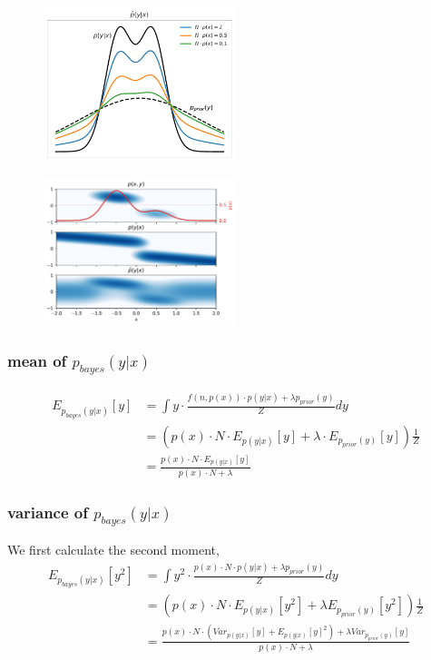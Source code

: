 \begin{figure}[H]
    \centering
    \includegraphics[width=0.5\textwidth]{Pictures/mixture_predictive_bayesian.pdf}
\end{figure}

\begin{figure}[H]
    \centering
    \includegraphics[width=0.5\textwidth]{Pictures/mixture_predictive_bayesian2D.pdf}
\end{figure}

\subsubsection*{mean of $p_{bayes}(y|x)$}
\begin{align*}
    E_{p_{bayes}(y|x)}[y] &= \int y \cdot \frac{f(n,p(x)) \cdot p(y|x) + \lambda p_{prior}(y)}{Z} dy\\
    &= \left(p(x)\cdot N \cdot E_{p(y|x)}[y] + \lambda \cdot E_{p_{prior}(y)}[y] \right) \frac{1}{Z}\\
    &= \frac{p(x)\cdot N\cdot E_{p(y|x)}[y]}{p(x)\cdot N+\lambda}
\end{align*}

\subsubsection*{variance of $p_{bayes}(y|x)$}
We first calculate the second moment, 
\begin{align*}
    E_{p_{bayes}(y|x)}[y^2] &= \int y^2 \cdot \frac{p(x)\cdot N \cdot p(y|x) + \lambda p_{prior}(y)}{Z} dy\\
    &= (p(x)\cdot N\cdot E_{p(y|x)}[y^2] + \lambda E_{p_{prior}(y)}[y^2] ) \frac{1}{Z}\\
    &= \frac{p(x)\cdot N \cdot(Var_{p(y|x)}[y]+E_{p(y|x)}[y]^2) + \lambda Var_{p_{prior}(y)}[y]}{p(x)\cdot N+\lambda}
\end{align*}

